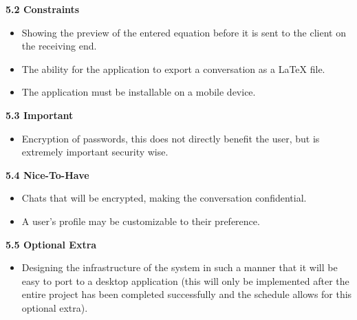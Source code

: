 \documentclass[29pt,a4paper]{moderncv}
\begin{document}
		\noindent \textbf{5.2 Constraints}
			\vspace{4mm}
			\begin{itemize}
				\item Showing the preview of the entered equation before it is sent to the client on the receiving end.
				\item The ability for the application to export a conversation as a LaTeX file.
				\item The application must be installable on a mobile device.
			\end{itemize}
			\vspace{5mm}

		\noindent \textbf{5.3 Important}
			\vspace{4mm}
			\begin{itemize}
				\item Encryption of passwords, this does not directly benefit the user, but is extremely important security wise. 
			\end{itemize}
			\vspace{5mm}
		
		\noindent \textbf{5.4 Nice-To-Have}
		\vspace{4mm}
			\begin{itemize}
				\item Chats that will be encrypted, making the conversation confidential.
				\item A user’s profile may be customizable to their preference.
			\end{itemize}	
		\vspace{5mm}
				
		\noindent \textbf{5.5 Optional Extra}
		\vspace{4mm}
			\begin{itemize}
			\item Designing the infrastructure of the system in such a manner that it will be easy to port to a desktop application (this will only be implemented after the entire project has been completed successfully and the schedule allows for this optional extra).
			\end{itemize}	
		\vspace{5mm}
\end{document}
